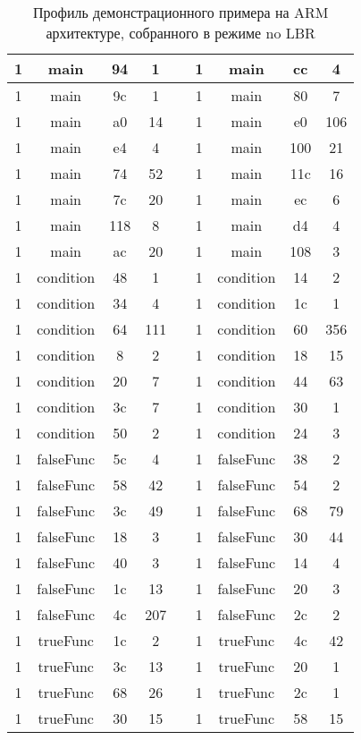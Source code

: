 \begin{table} [h]%
    \centering
    \begin{threeparttable}%
        \caption{Профиль демонстрационного примера на ARM архитектуре, собранного в режиме no LBR}%
        \label{tab:ARMnoLBR}%
        \begin{SingleSpace}
            \begin{tabular}{| c | c | c | c | c | c | c | c | c |}
            \hline
			1& main& 94& 1 & &
			1& main& cc& 4 \\ \hline
			1& main& 9c& 1 & &
			1& main& 80& 7 \\ \hline
			1& main& a0& 14 & &
			1& main& e0& 106 \\ \hline
			1& main& e4& 4 & &
			1& main& 100& 21 \\ \hline
			1& main& 74& 52 & &
			1& main& 11c& 16 \\ \hline
			1& main& 7c& 20 & &
			1& main& ec& 6 \\ \hline
			1& main& 118& 8 & &
			1& main& d4& 4 \\ \hline
			1& main& ac& 20 & &
			1& main& 108& 3 \\ \hline
			1& condition& 48& 1 & &
			1& condition& 14& 2 \\ \hline
			1& condition& 34& 4 & &
			1& condition& 1c& 1 \\ \hline
			1& condition& 64& 111 & &
			1& condition& 60& 356 \\ \hline
			1& condition& 8 &2 & &
			1& condition& 18& 15 \\ \hline
			1& condition& 20& 7 & &
			1& condition& 44& 63 \\ \hline
			1& condition& 3c& 7 & &
			1& condition& 30& 1 \\ \hline
			1& condition& 50& 2 & &
			1& condition& 24& 3 \\ \hline
			1& falseFunc& 5c& 4 & &
			1& falseFunc& 38& 2 \\ \hline
			1& falseFunc& 58& 42 & &
			1& falseFunc& 54& 2 \\ \hline
			1& falseFunc& 3c& 49 & &
			1& falseFunc& 68& 79 \\ \hline
			1& falseFunc& 18& 3 & &
			1& falseFunc& 30& 44 \\ \hline
			1& falseFunc& 40& 3 & &
			1& falseFunc& 14& 4 \\ \hline
			1& falseFunc& 1c& 13 & &
			1& falseFunc& 20& 3 \\ \hline
			1& falseFunc& 4c& 207 & &
			1& falseFunc& 2c& 2 \\ \hline
			1& trueFunc& 1c& 2 & &
			1& trueFunc& 4c& 42 \\ \hline
			1& trueFunc& 3c& 13 & &
			1& trueFunc& 20& 1 \\ \hline
			1& trueFunc& 68& 26 & &
			1& trueFunc& 2c& 1 \\ \hline
			1& trueFunc& 30& 15 & &
			1& trueFunc& 58& 15 \\ \hline


\end{tabular}
\end{SingleSpace}
\end{threeparttable}
\end{table}
